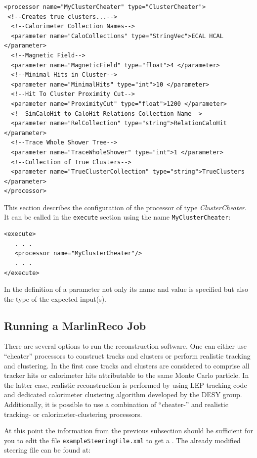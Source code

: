 \begin{verbatim} 
<processor name="MyClusterCheater" type="ClusterCheater">
 <!--Creates true clusters...-->
  <!--Calorimeter Collection Names-->
  <parameter name="CaloCollections" type="StringVec">ECAL HCAL  </parameter>
  <!--Magnetic Field-->
  <parameter name="MagneticField" type="float">4 </parameter>
  <!--Minimal Hits in Cluster-->
  <parameter name="MinimalHits" type="int">10 </parameter>
  <!--Hit To Cluster Proximity Cut-->
  <parameter name="ProximityCut" type="float">1200 </parameter>
  <!--SimCaloHit to CaloHit Relations Collection Name-->
  <parameter name="RelCollection" type="string">RelationCaloHit </parameter>
  <!--Trace Whole Shower Tree-->
  <parameter name="TraceWholeShower" type="int">1 </parameter>
  <!--Collection of True Clusters-->
  <parameter name="TrueClusterCollection" type="string">TrueClusters </parameter>
</processor>
\end{verbatim}

This section describes the configuration of the processor of type
{\em ClusterCheater}. It can be called in the {\tt execute} section 
using the name {\tt MyClusterCheater}:

\begin{verbatim}
<execute>
   . . .
   <processor name="MyClusterCheater"/>
   . . .
</execute>
\end{verbatim}

In the definition of a parameter not only its name and value is 
specified but also the type of the expected input(s).

\subsection{Running a MarlinReco Job}

There are several options to run the reconstruction software. One can
either use ``cheater'' processors to construct tracks and clusters or
perform realistic tracking and clustering. In the first case tracks
and clusters are considered to comprise all tracker hits or
calorimeter hits attributable to the same Monte Carlo particle. In the
latter case, realistic reconstruction is performed by using LEP
tracking code and dedicated calorimeter
clustering algorithm developed by the DESY group. Additionally, it is
possible to use a combination of ``cheater-'' and realistic tracking- or
calorimeter-clustering processors. 

At this point the information from the previous subsection should be sufficient
for you to edit the file {\tt exampleSteeringFile.xml} to get a 
.
The already modified steering file can be found at:

